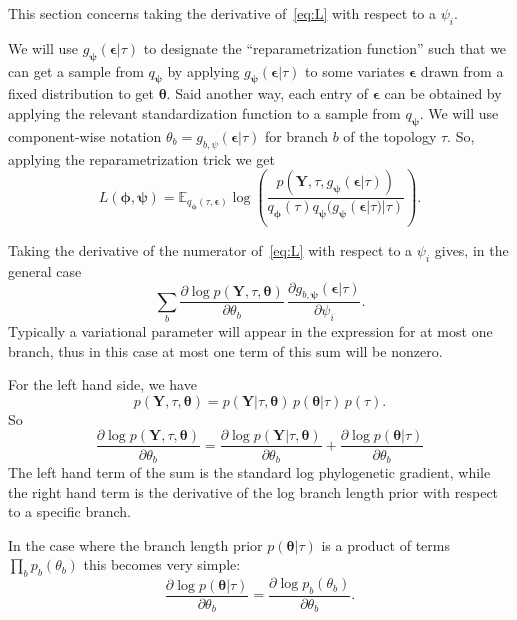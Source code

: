 \documentclass{article}
\begin{document}
This section concerns taking the derivative of~\eqref{eq:L} with respect to a $\psi_i$.

We will use $g_{\bm{\psi}}(\bm{\epsilon}|\tau)$ to designate the ``reparametrization function'' such that we can get a sample from $q_{\bm\psi}$ by applying $g_{\bm{\psi}}(\bm{\epsilon}|\tau)$ to some variates $\bm\epsilon$ drawn from a fixed distribution to get $\bm\theta$.
Said another way, each entry of $\bm{\epsilon}$ can be obtained by applying the relevant standardization function to a sample from $q_{\bm\psi}$.
We will use component-wise notation $\theta_b = g_{b, \psi}(\bm\epsilon|\tau)$ for branch $b$ of the topology $\tau$.
So, applying the reparametrization trick we get
\begin{equation}
L(\bm{\phi},{\bm{\psi}}) = \mathbb{E}_{
    q_{\bm{\phi}}(\tau,\bm{\epsilon})}
    \log\left(
        \frac
        {p(\bm{Y},\tau,g_{\bm{\psi}}(\bm{\epsilon}|\tau))}
        {q_{\bm{\phi}}(\tau)q_{\bm{\psi}}(g_{\bm{\psi}}(\bm{\epsilon}|\tau)|\tau)}
    \right).
\label{eq:L}
\end{equation}

Taking the derivative of the numerator of~\eqref{eq:L} with respect to a $\psi_i$ gives, in the general case
\begin{equation}
    \sum_b
    \frac{\partial \log p(\bm{Y} , \tau, \bm\theta)}{\partial \theta_b} \,
    \frac{\partial g_{b,\bm\psi}(\bm\epsilon | \tau)}{\partial \psi_i}.
    \label{eq:dlogpdPsi}
\end{equation}
Typically a variational parameter will appear in the expression for at most one branch, thus in this case at most one term of this sum will be nonzero.

For the left hand side, we have
\[
p(\bm{Y},\tau,\bm\theta) =
p(\bm{Y}|\tau,\bm\theta) \, p(\bm\theta | \tau) \, p(\tau).
\]
So
\begin{equation*}
\frac{\partial \log p(\bm{Y}, \tau, \bm\theta)}{\partial \theta_b} =
\frac{\partial \log p(\bm{Y} | \tau, \bm\theta)}{\partial \theta_b}
+
\frac{\partial \log p(\bm\theta | \tau)}{\partial \theta_b}
\end{equation*}
The left hand term of the sum is the standard log phylogenetic gradient, while the right hand term is the derivative of the log branch length prior with respect to a specific branch.

In the case where the branch length prior $p(\bm\theta | \tau)$ is a product of terms $\prod_b p_b(\theta_b)$ this becomes very simple:
\[
    \frac{\partial \log p(\bm\theta | \tau)}{\partial \theta_b} =
    \frac{\partial \log p_b(\theta_b)}{\partial \theta_b}.
\]
\end{document}
